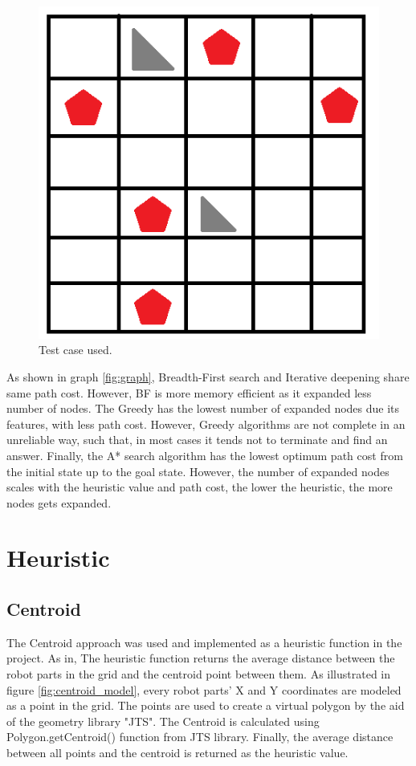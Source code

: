 \begin{figure}[H] 
   	\centering
	\includegraphics[scale=0.6]{images/grid} 
    \caption{Test case used.}
    \label{fig:grid} 
\end{figure}

As shown in graph \ref{fig:graph}, Breadth-First search and Iterative deepening share same path cost. However, BF is more memory efficient as it expanded less number of nodes. The Greedy has the lowest number of expanded nodes due its features, with less path cost. However, Greedy algorithms are not complete in an unreliable way, such that, in most cases it tends not to terminate and find an answer. Finally, the A* search algorithm has the lowest optimum path cost from the initial state up to the goal state. However, the number of expanded nodes scales with the heuristic value and path cost, the lower the heuristic, the more nodes gets expanded.



\chapter{Heuristic}
\section{Centroid}

The Centroid approach was used and implemented as a heuristic function in the project. As in, The heuristic function returns the average distance between the robot parts in the grid and the centroid point between them. As illustrated in figure \ref{fig:centroid_model}, every robot parts' X and Y coordinates are modeled as a point in the grid. The points are used to create a virtual polygon by the aid of the geometry library "JTS". The Centroid is calculated using Polygon.getCentroid() function from JTS library. Finally, the average distance between all points and the centroid is returned as the heuristic value.

